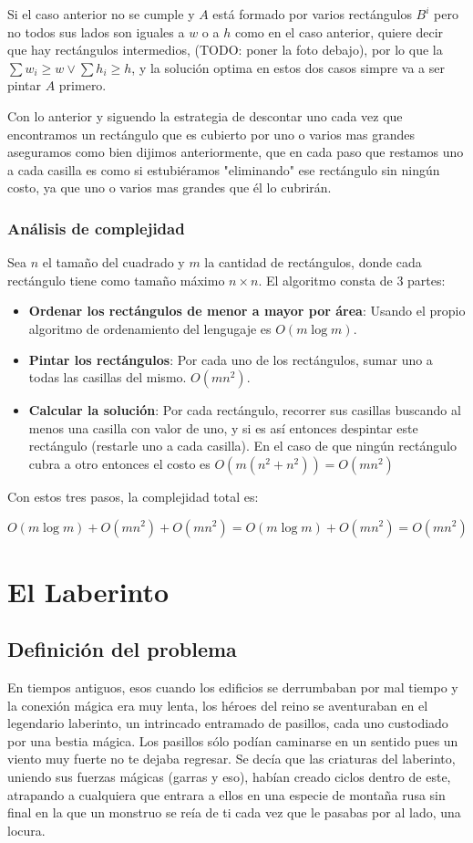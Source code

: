 \documentclass{article}
\begin{document}
   Si el caso anterior no se cumple y $A$ está formado por varios rectángulos $B^{i}$ pero no todos sus lados son iguales a $w$ o a $h$ como en el caso anterior, quiere decir que hay rectángulos intermedios, (TODO: poner la foto debajo), por lo que la $\sum{w_i} \geq w \lor \sum{h_i} \geq h$, y la solución optima en estos dos casos simpre va a ser pintar $A$ primero.

 Con lo anterior y siguendo la estrategia de descontar uno cada vez que encontramos un rectángulo que es cubierto por uno o varios mas grandes aseguramos como bien dijimos anteriormente, que en cada paso que restamos uno a cada casilla es como si estubiéramos "eliminando" ese rectángulo sin ningún costo, ya que uno o varios mas grandes que él lo cubrirán.
\subsubsection{Análisis de complejidad}
Sea $n$ el tamaño del cuadrado y $m$ la cantidad de rectángulos, donde cada rectángulo tiene como tamaño máximo $n \times n$. El algoritmo consta de 3 partes:

\begin{itemize}
\item \textbf{Ordenar los rectángulos de menor a mayor por área}: Usando el propio algoritmo de ordenamiento del lengugaje es $O(m \log m)$.
\item \textbf{Pintar los rectángulos}: Por cada uno de los rectángulos, sumar uno a todas las casillas del mismo. $O(m n^2)$.
\item \textbf{Calcular la solución}: Por cada rectángulo, recorrer sus casillas buscando al menos una casilla con valor de uno, y si es así entonces despintar este rectángulo (restarle uno a cada casilla). En el caso de que ningún rectángulo cubra a otro entonces el costo es $O(m(n^2 + n^2)) = O(mn^2)$
  \end{itemize}
Con estos tres pasos, la complejidad total es:

$$
O(m \log m) + O(mn^2) + O(mn^2) = O(m \log m) + O(mn^2) = O(mn^2)
$$
\section{El Laberinto}
	\subsection{Definición del problema}
	En tiempos antiguos, esos cuando los edificios se derrumbaban por mal tiempo y la conexión mágica era muy lenta, los héroes del reino se aventuraban en el legendario laberinto, un intrincado entramado de pasillos, cada uno custodiado por una bestia mágica. Los pasillos sólo podían caminarse en un sentido pues un viento muy fuerte no te dejaba regresar. Se decía que las criaturas del laberinto, uniendo sus fuerzas mágicas (garras y eso), habían creado ciclos dentro de este, atrapando a cualquiera que entrara a ellos en una especie de montaña rusa sin final en la que un monstruo se reía de ti cada vez que le pasabas por al lado, una locura.
\end{document}
